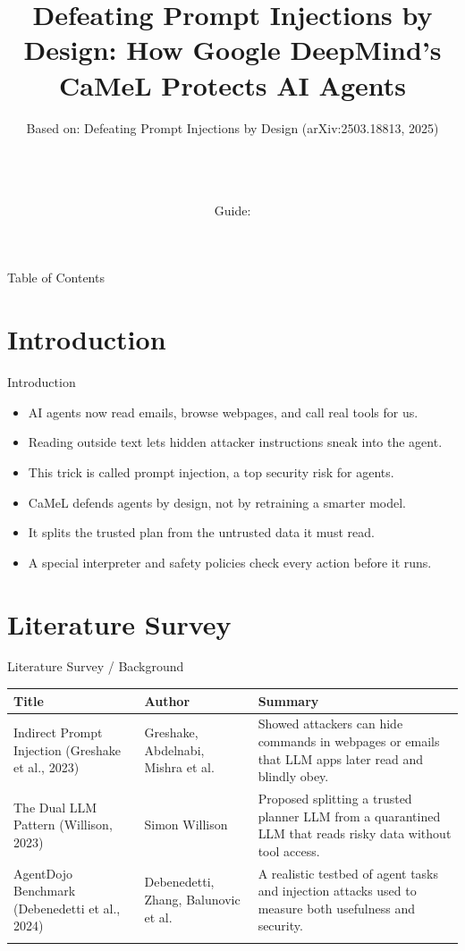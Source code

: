 \documentclass[10pt]{beamer}
\title[B.Tech Seminar]{Defeating Prompt Injections by Design: How Google DeepMind's CaMeL Protects AI Agents}
\subtitle{Based on: Defeating Prompt Injections by Design (arXiv:2503.18813, 2025)}
\author[\studentname\ (\shortinst)]{\studentname \\ \small \rollno \\ \small \rollclass \\ \small Guide: \guidename}
\institute[]{\deptname \\ \collegename}
\date{\seminardate}
\begin{document}
\begin{frame}[plain]
  \titlepage
\end{frame}
\begin{frame}{Table of Contents}
  \tableofcontents
\end{frame}
\section{Introduction}
\begin{frame}{Introduction}
\begin{itemize}
  \item AI agents now read emails, browse webpages, and call real tools for us.
  \item Reading outside text lets hidden attacker instructions sneak into the agent.
  \item This trick is called prompt injection, a top security risk for agents.
  \item CaMeL defends agents by design, not by retraining a smarter model.
  \item It splits the trusted plan from the untrusted data it must read.
  \item A special interpreter and safety policies check every action before it runs.
\end{itemize}
\end{frame}
\section{Literature Survey}
\begin{frame}{Literature Survey / Background}
  \small
  \begin{tabular}{@{}p{2.7cm}p{2.3cm}p{5.6cm}@{}}
    \toprule
    \textbf{Title} & \textbf{Author} & \textbf{Summary} \\
    \midrule
    Indirect Prompt Injection (Greshake et al., 2023) & Greshake, Abdelnabi, Mishra et al. & Showed attackers can hide commands in webpages or emails that LLM apps later read and blindly obey. \\
    \addlinespace
    The Dual LLM Pattern (Willison, 2023) & Simon Willison & Proposed splitting a trusted planner LLM from a quarantined LLM that reads risky data without tool access. \\
    \addlinespace
    AgentDojo Benchmark (Debenedetti et al., 2024) & Debenedetti, Zhang, Balunovic et al. & A realistic testbed of agent tasks and injection attacks used to measure both usefulness and security. \\
    \addlinespace
    \bottomrule
  \end{tabular}
\end{frame}
\end{document}
